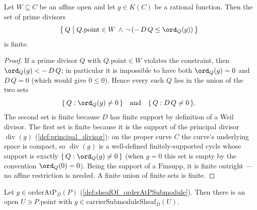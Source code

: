 \begin{lemma}

  \label{lem:finite_orderConstraintFail_affine}
  Let \(W \subseteq C\) be an affine open and let \(g \in K(C)\) be a rational
  function. Then the set of prime divisors
  \[
    \bigl\{\, Q \;\big|\; Q.\mathrm{point} \in W \,\land\,
      \neg\,(-\,D\,Q \le \ord_Q(g)) \,\bigr\}
  \]
  is finite.
\end{lemma}

\begin{proof}
  If a prime divisor \(Q\) with \(Q.\mathrm{point} \in W\) violates the
  constraint, then \(\ord_Q(g) < -\,D\,Q\); in particular it is impossible to
  have both \(\ord_Q(g) = 0\) and \(D\,Q = 0\) (which would give \(0 \le 0\)).
  Hence every such \(Q\) lies in the union of the two sets
  \[
    \{\, Q : \ord_Q(g) \ne 0 \,\}
    \quad\text{and}\quad
    \{\, Q : D\,Q \ne 0 \,\}.
  \]
  The second set is finite because \(D\) has finite support by definition of a
  Weil divisor. The first set is finite because it is the support of the
  principal divisor \(\operatorname{div}(g)\) (\cref{def:principal_divisor}):
  on the proper curve \(C\) the curve's underlying space is compact, so
  \(\operatorname{div}(g)\) is a well-defined finitely-supported cycle whose
  support is exactly \(\{\, Q : \ord_Q(g) \ne 0 \,\}\) (when \(g = 0\) this set
  is empty by the convention \(\ord_Q(0) = 0\)). Being the support of a
  \(\mathrm{Finsupp}\), it is finite outright — no affine restriction is
  needed. A finite union of finite sets is finite.
\end{proof}

\begin{lemma}

  \label{lem:exists_open_mem_carrierSubmoduleSheaf}
  Let \(g \in \mathrm{orderAtP}_D(P)\) (\cref{def:sheafOf_orderAtPSubmodule}).
  Then there is an open \(U \ni P.\mathrm{point}\) with
  \(g \in \mathrm{carrierSubmoduleSheaf}_D(U)\).
\end{lemma}

